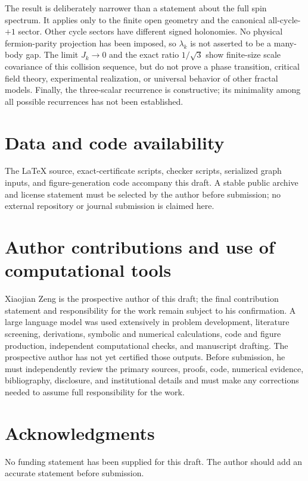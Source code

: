 \documentclass[11pt]{article}
\theoremstyle{remark}
\begin{document}
The result is deliberately narrower than a statement about the full spin
spectrum.  It applies only to the finite open geometry and the canonical
all-cycle-$+1$ sector.  Other cycle sectors have different signed holonomies.
No physical fermion-parity projection has been imposed, so $\lambda_k$ is not
asserted to be a many-body gap.  The limit $J_k\to0$ and the exact ratio
$1/\sqrt3$ show finite-size scale covariance of this collision sequence, but
do not prove a phase transition, critical field theory, experimental
realization, or universal behavior of other fractal models.  Finally, the
three-scalar recurrence is constructive; its minimality among all possible
recurrences has not been established.

\section*{Data and code availability}

The LaTeX source, exact-certificate scripts, checker scripts, serialized graph
inputs, and figure-generation code accompany this draft.  A stable public
archive and license statement must be selected by the author before
submission; no external repository or journal submission is claimed here.

\section*{Author contributions and use of computational tools}

Xiaojian Zeng is the prospective author of this draft; the final contribution
statement and responsibility for the work remain subject to his confirmation.
A large language model was used extensively in problem development,
literature screening, derivations, symbolic and numerical calculations, code
and figure production, independent computational checks, and manuscript
drafting.  The prospective author has not yet certified those outputs.  Before
submission, he must independently review the primary sources, proofs, code,
numerical evidence, bibliography, disclosure, and institutional details and
must make any corrections needed to assume full responsibility for the work.

\section*{Acknowledgments}

No funding statement has been supplied for this draft.  The author should add
an accurate statement before submission.



\end{document}
